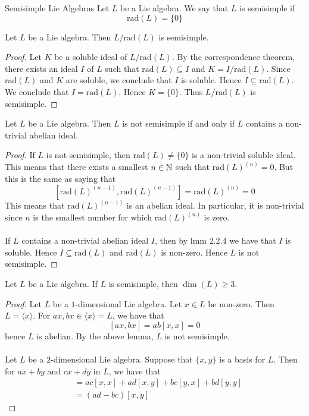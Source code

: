 \documentclass[a4paper]{article}
\begin{document}
\begin{defn}{Semisimple Lie Algebras}{}{} Let $L$ be a Lie algebra. We say that $L$ is semisimple if $$\text{rad}(L)=\{0\}$$
\end{defn}

\begin{lmm}{}{} Let $L$ be a Lie algebra. Then $L/\text{rad}(L)$ is semisimple. \tcbline
\begin{proof}
Let $K$ be a soluble ideal of $L/\text{rad}(L)$. By the correspondence theorem, there exists an ideal $I$ of $L$ such that $\text{rad}(L)\subseteq I$ and $K=I/\text{rad}(L)$. Since $\text{rad}(L)$ and $K$ are soluble, we conclude that $I$ is soluble. Hence $I\subseteq\text{rad}(L)$. We conclude that $I=\text{rad}(L)$. Hence $K=\{0\}$. Thus $L/\text{rad}(L)$ is semisimple. 
\end{proof}
\end{lmm}

\begin{lmm}{}{} Let $L$ be a Lie algebra. Then $L$ is not semisimple if and only if $L$ contains a non-trivial abelian ideal. \tcbline
\begin{proof}
If $L$ is not semisimple, then $\text{rad}(L)\neq\{0\}$ is a non-trivial soluble ideal. This means that there exists a smallest $n\in\mathbb{N}$ such that $\text{rad}(L)^{(n)}=0$. But this is the same as saying that $$[\text{rad}(L)^{(n-1)},\text{rad}(L)^{(n-1)}]=\text{rad}(L)^{(n)}=0$$ This means that $\text{rad}(L)^{(n-1)}$ is an abelian ideal. In particular, it is non-trivial since $n$ is the smallest number for which $\text{rad}(L)^{(n)}$ is zero. \\~\\

If $L$ contains a non-trivial abelian ideal $I$, then by lmm 2.2.4 we have that $I$ is soluble. Hence $I\subseteq\text{rad}(L)$ and $\text{rad}(L)$ is non-zero. Hence $L$ is not semisimple. 
\end{proof}
\end{lmm}

\begin{prp}{}{} Let $L$ be a Lie algebra. If $L$ is semisimple, then $\dim(L)\geq 3$. \tcbline
\begin{proof}
Let $L$ be a $1$-dimensional Lie algebra. Let $x\in L$ be non-zero. Then $L=\langle x\rangle$. For $ax,bx\in\langle x\rangle=L$, we have that $$[ax,bx]=ab[x,x]=0$$ hence $L$ is abelian. By the above lemma, $L$ is not semisimple. \\~\\

Let $L$ be a $2$-dimensional Lie algebra. Suppose that $\{x,y\}$ is a basis for $L$. Then for $ax+by$ and $cx+dy$ in $L$, we have that 
\begin{align*}
[ax+by,cx+dy]&=ac[x,x]+ad[x,y]+bc[y,x]+bd[y,y]\\
&=(ad-bc)[x,y]
\end{align*}
\end{proof}
\end{prp}
\end{document}

